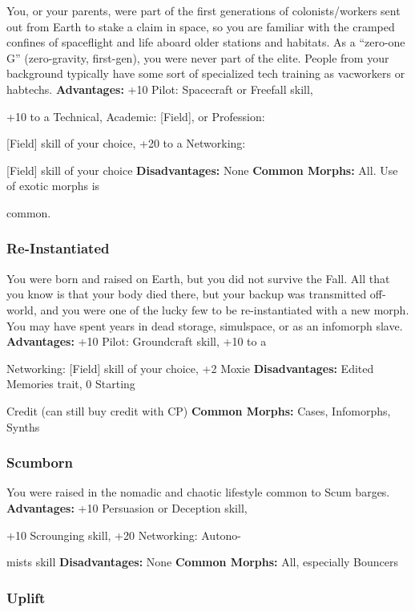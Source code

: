 You, or your parents, were part of the first generations
of colonists/workers sent out from Earth to
stake a claim in space, so you are familiar with the 
cramped confines of spaceflight and life aboard older 
stations and habitats. As a ``zero-one G'' (zero-gravity, 
first-gen), you were never part of the elite. People from 
your background typically have some sort of specialized
tech training as vacworkers or habtechs.
\textbf{Advantages:} +10 Pilot: Spacecraft or Freefall skill, 

+10 to a Technical, Academic: [Field], or Profession: 

[Field] skill of your choice, +20 to a Networking: 

[Field] skill of your choice
\textbf{Disadvantages:} None
\textbf{Common Morphs:} All. Use of exotic morphs is 

common.

\subsubsection{Re-Instantiated}

You were born and raised on Earth, but you did not 
survive the Fall. All that you know is that your body 
died there, but your backup was transmitted off-world, 
and you were one of the lucky few to be re-instantiated 
with a new morph. You may have spent years in dead 
storage, simulspace, or as an infomorph slave.
\textbf{Advantages:  }+10 Pilot: Groundcraft skill, +10 to a 

Networking: [Field] skill of your choice, +2 Moxie
\textbf{Disadvantages:} Edited Memories trait, 0 Starting 

Credit (can still buy credit with CP)
\textbf{Common Morphs:} Cases, Infomorphs, Synths

\subsubsection{Scumborn}

You were raised in the nomadic and chaotic lifestyle 
common to Scum barges.
\textbf{Advantages:} +10 Persuasion or Deception skill, 

+10 Scrounging skill, +20 Networking: Autono-

mists skill
\textbf{Disadvantages:} None
\textbf{Common Morphs:} All, especially Bouncers

\subsubsection{Uplift}


